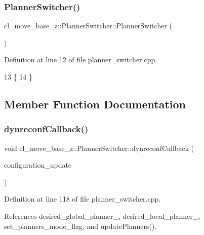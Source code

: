 \subsubsection{\texorpdfstring{Planner\+Switcher()}{PlannerSwitcher()}}
{\footnotesize\ttfamily cl\+\_\+move\+\_\+base\+\_\+z\+::\+Planner\+Switcher\+::\+Planner\+Switcher (\begin{DoxyParamCaption}{ }\end{DoxyParamCaption})}



Definition at line 12 of file planner\+\_\+switcher.\+cpp.


\begin{DoxyCode}
13 \{
14 \}
\end{DoxyCode}


\subsection{Member Function Documentation}
\mbox{\label{classcl__move__base__z_1_1PlannerSwitcher_ad9371bd8d62600ef874e8914c3ec177b}} 
\subsubsection{\texorpdfstring{dynreconf\+Callback()}{dynreconfCallback()}}
{\footnotesize\ttfamily void cl\+\_\+move\+\_\+base\+\_\+z\+::\+Planner\+Switcher\+::dynreconf\+Callback (\begin{DoxyParamCaption}\item[{const dynamic\+\_\+reconfigure\+::\+Config\+::\+Const\+Ptr \&}]{configuration\+\_\+update }\end{DoxyParamCaption})\hspace{0.3cm}{\ttfamily [private]}}



Definition at line 118 of file planner\+\_\+switcher.\+cpp.



References desired\+\_\+global\+\_\+planner\+\_\+, desired\+\_\+local\+\_\+planner\+\_\+, set\+\_\+planners\+\_\+mode\+\_\+flag, and update\+Planners().



